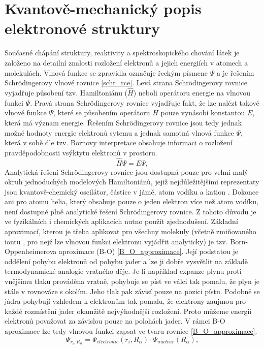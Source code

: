 \documentclass[
digital, %
table,   %
lof,     %
lot,     %
oneside,
]{fithesis3}
\begin{document}
\section{Kvantově-mechanický popis elektronové struktury}
Současné chápání struktury, reaktivity a spektroskopického chování látek je založeno na detailní znalosti rozložení elektronů a jejich energiích v atomech a molekulách. Vlnová funkce se zpravidla označuje řeckým písmene $\Psi$ a je řešením Schrödingerovy vlnové rovnice \ref{schr_rce}. Levá strana Schrödingerovy rovnice vyjadřuje působení tzv. Hamiltoniánu ($\widehat{H}$) neboli operátoru energie na vlnovou funkci $\Psi$. Pravá strana Schrödingerovy rovnice vyjadřuje fakt, že lze nalézt takové vlnové funkce $\Psi$, které se působením operátoru $\widehat{H}$ pouze vynásobí konstantou $E$, která má význam energie. Řešením Schrödingerovy rovnice jsou tedy jednak možné hodnoty energie elektronů sytemu a jednak samotná vlnová funkce $\Psi$, která v sobě dle tzv. Bornovy interpretace obsahuje informaci o rozložení pravděpodobnosti vsýktytu elektronů v prostoru.
\begin{equation}
\widehat{H} \Psi = E \Psi,
\label{schr_rce}
\end{equation}
Analytická řešení Schrödingerovy rovnice jsou dostupná pouze pro velmi malý okruh jednoduchých modelových Hamiltoniánů, jejiž nejdůležitějšími reprezentaty jsou kvantově-chemický oscilátor, částice v jámě, atom vodíku a kation . Dokonce ani pro atomu helia, který obsahuje pouze o jeden elektron více než atom vodíku, není dostupné plně analytické řešení Schrödingerovy rovnice.
Z tohoto důvodu je ve fyzikálních i chemických aplikacích nutno použít zjednodušení. Základní aproximací, kterou je třeba aplikovat pro všechny molekuly (včetně zmiňovaného iontu , pro nejž lze vlnovou funkci elektronu vyjádřit analyticky) je tzv. Born-Oppenheimerova aproximace (B-O) \ref{B_O_approximace}.
Její podstatou je oddělení pohybu elektronů od pohybu jader a lze ji dobře vysvětlit na základě termodynamické analogie vratného děje. Je-li například expanze plynu proti vnějšímu tlaku prováděna vratně, pohybuje se píst ve válci tak pomalu, že plyn je stále v rovnováze s okolím. Jeho tlak pak závisí pouze na pozici pístu. Podobně se jádra pohybují vzhledem k elektronům tak pomalu, že elektrony zaujmou pro každé rozmístění jader okamžitě nejvýhodnější rozložení. Proto můžeme energii elektronů považovat za závislou pouze na polohách jader. V rámci B-O aproximace lze tedy vlnovou funkci zapsat ve tvaru rovnice \ref{B_O_approximace}.
\begin{equation}
\Psi_{r_i,R_{\alpha}} = \Psi_{electronic}(r_i,R_{\alpha}) \cdot \Psi_{nuclear}(R_{\alpha}),
\label{B_O_approximace}
\end{equation}
\end{document}
